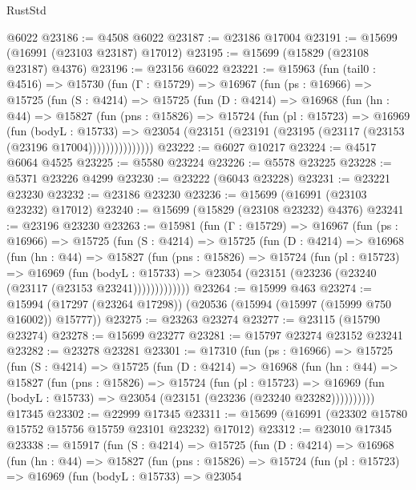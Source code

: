 \begin{lexlean}{RustStd}
\begin{coremodule}
    @6022
@23186 := @4508 @6022
@23187 := @23186 @17004
@23191 := @15699 (@16991 (@23103 @23187) @17012)
@23195 := @15699 (@15829 (@23108 @23187) @4376)
@23196 := @23156 @6022
@23221 := @15963
    (fun (tail0 : @4516) =>
    @15730
      (fun (Γ : @15729) =>
      @16967
        (fun (ps : @16966) =>
        @15725
          (fun (S : @4214) =>
          @15725
            (fun (D : @4214) =>
            @16968
              (fun (hn : @44) =>
              @15827
                (fun (pns : @15826) =>
                @15724
                  (fun (pl : @15723) =>
                  @16969
                    (fun (bodyL : @15733) =>
                    @23054 (@23151 (@23191 (@23195 (@23117 (@23153 (@23196 @17004)))))))))))))))
@23222 := @6027 @10217
@23224 := @4517 @6064 @4525
@23225 := @5580 @23224
@23226 := @5578 @23225
@23228 := @5371 @23226 @4299
@23230 := @23222 (@6043 @23228)
@23231 := @23221 @23230
@23232 := @23186 @23230
@23236 := @15699 (@16991 (@23103 @23232) @17012)
@23240 := @15699 (@15829 (@23108 @23232) @4376)
@23241 := @23196 @23230
@23263 := @15981
    (fun (Γ : @15729) =>
    @16967
      (fun (ps : @16966) =>
      @15725
        (fun (S : @4214) =>
        @15725
          (fun (D : @4214) =>
          @16968
            (fun (hn : @44) =>
            @15827
              (fun (pns : @15826) =>
              @15724
                (fun (pl : @15723) =>
                @16969
                  (fun (bodyL : @15733) =>
                  @23054 (@23151 (@23236 (@23240 (@23117 (@23153 @23241)))))))))))))
@23264 := @15999 @463
@23274 := @15994 (@17297 (@23264 @17298)) (@20536 (@15994 (@15997 (@15999 @750 @16002)) @15777))
@23275 := @23263 @23274
@23277 := @23115 (@15790 @23274)
@23278 := @15699 @23277
@23281 := @15797 @23274 @23152 @23241
@23282 := @23278 @23281
@23301 := @17310
    (fun (ps : @16966) =>
    @15725
      (fun (S : @4214) =>
      @15725
        (fun (D : @4214) =>
        @16968
          (fun (hn : @44) =>
          @15827
            (fun (pns : @15826) =>
            @15724
              (fun (pl : @15723) =>
              @16969 (fun (bodyL : @15733) => @23054 (@23151 (@23236 (@23240 @23282))))))))))
    @17345
@23302 := @22999 @17345
@23311 := @15699 (@16991 (@23302 @15780 @15752 @15756 @15759 @23101 @23232) @17012)
@23312 := @23010 @17345
@23338 := @15917
    (fun (S : @4214) =>
    @15725
      (fun (D : @4214) =>
      @16968
        (fun (hn : @44) =>
        @15827
          (fun (pns : @15826) =>
          @15724
            (fun (pl : @15723) =>
            @16969
              (fun (bodyL : @15733) =>
              @23054

\end{coremodule}
\end{lexlean}
